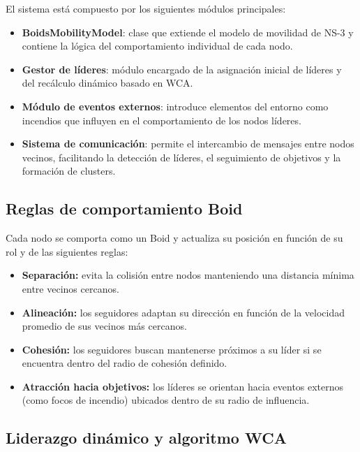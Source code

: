 \documentclass{article}
\begin{document}
El sistema está compuesto por los siguientes módulos principales:

\begin{itemize}
    \item \textbf{BoidsMobilityModel}: clase que extiende el modelo de movilidad de NS-3 y contiene la lógica del comportamiento individual de cada nodo.
    \item \textbf{Gestor de líderes}: módulo encargado de la asignación inicial de líderes y del recálculo dinámico basado en WCA.
    \item \textbf{Módulo de eventos externos}: introduce elementos del entorno como incendios que influyen en el comportamiento de los nodos líderes.
    \item \textbf{Sistema de comunicación}: permite el intercambio de mensajes entre nodos vecinos, facilitando la detección de líderes, el seguimiento de objetivos y la formación de clusters.
\end{itemize}

\subsection{Reglas de comportamiento Boid}

Cada nodo se comporta como un Boid y actualiza su posición en función de su rol y de las siguientes reglas:

\begin{itemize}
    \item \textbf{Separación:} evita la colisión entre nodos manteniendo una distancia mínima entre vecinos cercanos.
    
    \item \textbf{Alineación:} los seguidores adaptan su dirección en función de la velocidad promedio de sus vecinos más cercanos.
    
    \item \textbf{Cohesión:} los seguidores buscan mantenerse próximos a su líder si se encuentra dentro del radio de cohesión definido.
    
    \item \textbf{Atracción hacia objetivos:} los líderes se orientan hacia eventos externos (como focos de incendio) ubicados dentro de su radio de influencia.
\end{itemize}

\subsection{Liderazgo dinámico y algoritmo WCA}
\end{document}
